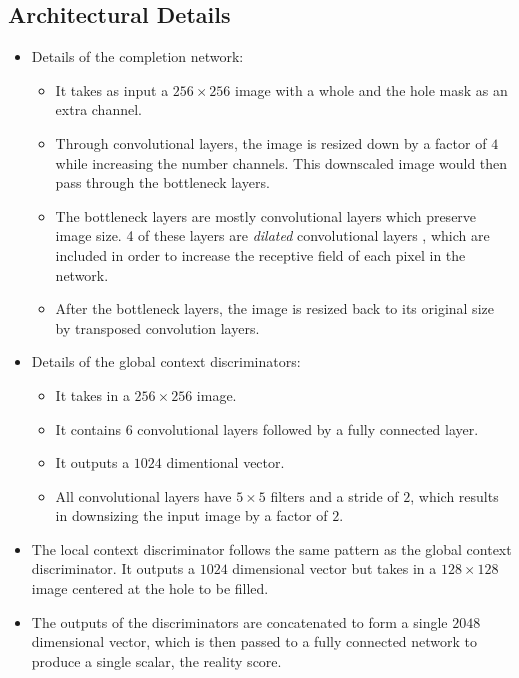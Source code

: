 \documentclass[10pt]{article}
\begin{document}
  \subsection{Architectural Details}  

  \begin{itemize}
  	\item Details of the completion network:
  	\begin{itemize}
  		\item It takes as input a $256 \times 256$ image with a whole and the hole mask as an extra channel.

  		\item Through convolutional layers, the image is resized down by a factor of $4$ while increasing the number channels. This downscaled image would then pass through the bottleneck layers.

  		\item The bottleneck layers are mostly convolutional layers which preserve image size. 4 of these layers are \emph{dilated} convolutional layers \cite{Yu:2016}, which are included in order to increase the receptive field of each pixel in the network.

  		\item After the bottleneck layers, the image is resized back to its original size by transposed convolution layers.
  	\end{itemize}

  	\item Details of the global context discriminators:
  	\begin{itemize}
  		\item It takes in a $256 \times 256$ image.
  		\item It contains $6$ convolutional layers followed by a fully connected layer.
  		\item It outputs a $1024$ dimentional vector.
  		\item All convolutional layers have $5 \times 5$ filters and a stride of $2$, which results in downsizing the input image by a factor of $2$.
  	\end{itemize}

  	\item The local context discriminator follows the same pattern as the global context discriminator. It outputs a $1024$ dimensional vector but takes in a $128 \times 128$ image centered at the hole to be filled.

  	\item The outputs of the discriminators are concatenated to form a single $2048$ dimensional vector, which is then passed to a fully connected network to produce a single scalar, the reality score.
  	 
  \end{itemize}
\end{document}
